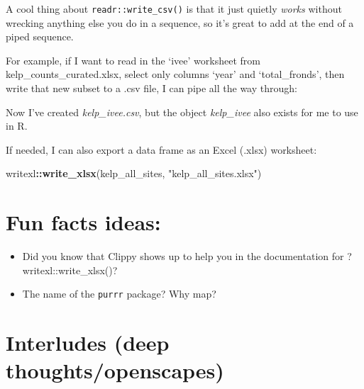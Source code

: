 \documentclass[]{book}
\newenvironment{Shaded}{\begin{snugshade}}{\end{snugshade}}
\newcommand{\DataTypeTok}[1]{\textcolor[rgb]{0.13,0.29,0.53}{#1}}
\newcommand{\KeywordTok}[1]{\textcolor[rgb]{0.13,0.29,0.53}{\textbf{#1}}}
\newcommand{\NormalTok}[1]{#1}
\newcommand{\OperatorTok}[1]{\textcolor[rgb]{0.81,0.36,0.00}{\textbf{#1}}}
\newcommand{\StringTok}[1]{\textcolor[rgb]{0.31,0.60,0.02}{#1}}
\providecommand{\tightlist}{%
  \setlength{\itemsep}{0pt}\setlength{\parskip}{0pt}}
\begin{document}
A cool thing about \texttt{readr::write\_csv()} is that it just quietly \emph{works} without wrecking anything else you do in a sequence, so it's great to add at the end of a piped sequence.

For example, if I want to read in the `ivee' worksheet from kelp\_counts\_curated.xlsx, select only columns `year' and `total\_fronds', then write that new subset to a .csv file, I can pipe all the way through:

\begin{Shaded}
\end{Shaded}

Now I've created \emph{kelp\_ivee.csv}, but the object \emph{kelp\_ivee} also exists for me to use in R.

If needed, I can also export a data frame as an Excel (.xlsx) worksheet:

\begin{Shaded}
\begin{Highlighting}[]
\NormalTok{writexl}\OperatorTok{::}\KeywordTok{write_xlsx}\NormalTok{(kelp_all_sites, }\StringTok{"kelp_all_sites.xlsx"}\NormalTok{)}
\end{Highlighting}
\end{Shaded}

\hypertarget{fun-facts-ideas}{%
\section{Fun facts ideas:}\label{fun-facts-ideas}}

\begin{itemize}
\tightlist
\item
  Did you know that Clippy shows up to help you in the documentation for ?writexl::write\_xlsx()?
\item
  The name of the \texttt{purrr} package? Why map?
\end{itemize}

\hypertarget{interludes-deep-thoughtsopenscapes-3}{%
\section{Interludes (deep thoughts/openscapes)}\label{interludes-deep-thoughtsopenscapes-3}}
\end{document}
